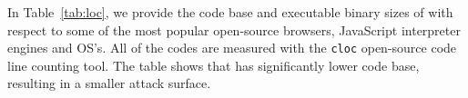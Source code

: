  In Table~\ref{tab:loc}, we provide the code base and executable binary sizes of \device with respect to some of the most popular open-source browsers, JavaScript interpreter engines and OS's. All of the codes are measured with the \texttt{cloc} open-source code line counting tool. The table shows that \name has significantly lower code base, resulting in a smaller attack surface.


